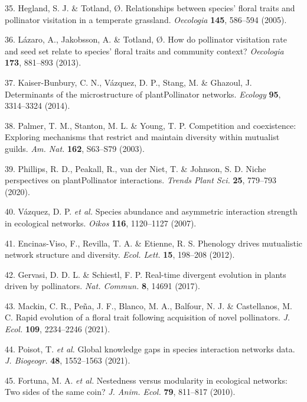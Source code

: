 \documentclass[12pt,a4paper,]{article}
\begin{document}
\hypertarget{ref-hegland2005}{}
35. Hegland, S. J. \& Totland, Ø. Relationships between species' floral
traits and pollinator visitation in a temperate grassland.
\emph{Oecologia} \textbf{145}, 586--594 (2005).

\hypertarget{ref-lazaro2013}{}
36. Lázaro, A., Jakobsson, A. \& Totland, Ø. How do pollinator
visitation rate and seed set relate to species' floral traits and
community context? \emph{Oecologia} \textbf{173}, 881--893 (2013).

\hypertarget{ref-kaiser2014}{}
37. Kaiser-Bunbury, C. N., Vázquez, D. P., Stang, M. \& Ghazoul, J.
Determinants of the microstructure of plantPollinator networks.
\emph{Ecology} \textbf{95}, 3314--3324 (2014).

\hypertarget{ref-palmer2003}{}
38. Palmer, T. M., Stanton, M. L. \& Young, T. P. Competition and
coexistence: Exploring mechanisms that restrict and maintain diversity
within mutualist guilds. \emph{Am. Nat.} \textbf{162}, S63--S79 (2003).

\hypertarget{ref-phillips2020}{}
39. Phillips, R. D., Peakall, R., van der Niet, T. \& Johnson, S. D.
Niche perspectives on plantPollinator interactions. \emph{Trends Plant
Sci.} \textbf{25}, 779--793 (2020).

\hypertarget{ref-vazquez2007}{}
40. Vázquez, D. P. \emph{et al.} Species abundance and asymmetric
interaction strength in ecological networks. \emph{Oikos} \textbf{116},
1120--1127 (2007).

\hypertarget{ref-encinas2012}{}
41. Encinas-Viso, F., Revilla, T. A. \& Etienne, R. S. Phenology drives
mutualistic network structure and diversity. \emph{Ecol. Lett.}
\textbf{15}, 198--208 (2012).

\hypertarget{ref-gervasi2017}{}
42. Gervasi, D. D. L. \& Schiestl, F. P. Real-time divergent evolution
in plants driven by pollinators. \emph{Nat. Commun.} \textbf{8}, 14691
(2017).

\hypertarget{ref-mackin2021}{}
43. Mackin, C. R., Peña, J. F., Blanco, M. A., Balfour, N. J. \&
Castellanos, M. C. Rapid evolution of a floral trait following
acquisition of novel pollinators. \emph{J. Ecol.} \textbf{109},
2234--2246 (2021).

\hypertarget{ref-poisot2021}{}
44. Poisot, T. \emph{et al.} Global knowledge gaps in species
interaction networks data. \emph{J. Biogeogr.} \textbf{48}, 1552--1563
(2021).

\hypertarget{ref-fortuna2010}{}
45. Fortuna, M. A. \emph{et al.} Nestedness versus modularity in
ecological networks: Two sides of the same coin? \emph{J. Anim. Ecol.}
\textbf{79}, 811--817 (2010).
\end{document}
